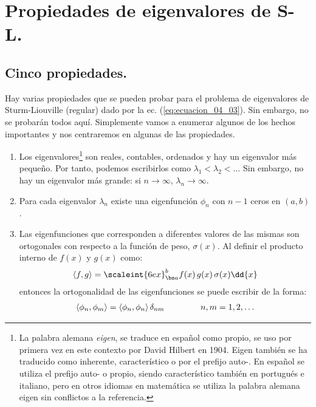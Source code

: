 \section{Propiedades de eigenvalores de S-L.}
\subsection{Cinco propiedades.}

Hay varias propiedades que se pueden probar para el problema de eigenvalores de Sturm-Liouville (regular) dado por la ec. (\ref{eq:ecuacion_04_03}). Sin embargo, no se probarán todos aquí. Simplemente vamos a enumerar algunos de los hechos importantes y nos centraremos en algunas de las propiedades.
\begin{enumerate}
\item Los eigenvalores\footnote{La palabra alemana \emph{eigen}, se traduce en español como propio, se uso por primera vez en este contexto por David Hilbert en 1904. Eigen también se ha traducido como inherente, característico o por el prefijo auto-. En español se utiliza el prefijo auto- o propio, siendo característico también en portugués e italiano, pero en otros idiomas en matemática se utiliza la palabra alemana eigen sin conflictos a la referencia.} son reales, contables, ordenados y hay un eigenvalor más pequeño. Por tanto, podemos escribirlos como $\lambda_{1} < \lambda_{2} < \ldots $ Sin embargo, no hay un eigenvalor más grande: si $n \to \infty$, $\lambda_{n} \to \infty$.
\item Para cada eigenvalor $\lambda_{n}$ existe una eigenfunción $\phi_{n}$ con $n - 1$ ceros en $(a, b)$.
\item Las eigenfunciones que corresponden a diferentes valores de las mismas son ortogonales con respecto a la función de peso, $\sigma (x)$. Al definir el producto interno de $f (x)$ y $g (x)$ como:
\begin{align}
\langle f , g \rangle = \scaleint{6ex}_{\bs a}^{b} f(x) \, g(x) \, \sigma(x) \dd{x}
\label{eq:ecuacion_04_11}
\end{align}
entonces la ortogonalidad de las eigenfunciones se puede escribir de la forma:
\begin{align}
\langle \phi_{n}, \phi_{m} \rangle = \langle \phi_{n}, \phi_{n} \rangle \, \delta_{nm} \hspace{1.5cm} n, m = 1, 2, \ldots
\label{eq:ecuacion_04_12}
\end{align}


\end{enumerate}
